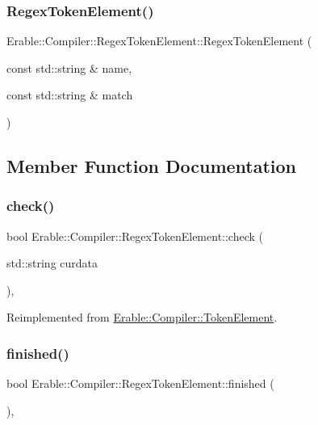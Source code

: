 \subsubsection{\texorpdfstring{RegexTokenElement()}{RegexTokenElement()}}
{\footnotesize\ttfamily Erable\+::\+Compiler\+::\+Regex\+Token\+Element\+::\+Regex\+Token\+Element (\begin{DoxyParamCaption}\item[{const std\+::string \&}]{name,  }\item[{const std\+::string \&}]{match }\end{DoxyParamCaption})}



\subsection{Member Function Documentation}
\mbox{\label{class_erable_1_1_compiler_1_1_regex_token_element_acfd2c3aed9ab516144e6d98b8ce5690d}} 
\subsubsection{\texorpdfstring{check()}{check()}}
{\footnotesize\ttfamily bool Erable\+::\+Compiler\+::\+Regex\+Token\+Element\+::check (\begin{DoxyParamCaption}\item[{std\+::string}]{curdata }\end{DoxyParamCaption})\hspace{0.3cm}{\ttfamily [override]}, {\ttfamily [virtual]}}



Reimplemented from \mbox{\hyperlink{class_erable_1_1_compiler_1_1_token_element_a939f70ed141904d769b6d9f6ecf39cb1}{Erable\+::\+Compiler\+::\+Token\+Element}}.

\mbox{\label{class_erable_1_1_compiler_1_1_regex_token_element_ae97792bfc64def19e42876c7d823b9e4}} 
\subsubsection{\texorpdfstring{finished()}{finished()}}
{\footnotesize\ttfamily bool Erable\+::\+Compiler\+::\+Regex\+Token\+Element\+::finished (\begin{DoxyParamCaption}{ }\end{DoxyParamCaption})\hspace{0.3cm}{\ttfamily [override]}, {\ttfamily [virtual]}}



